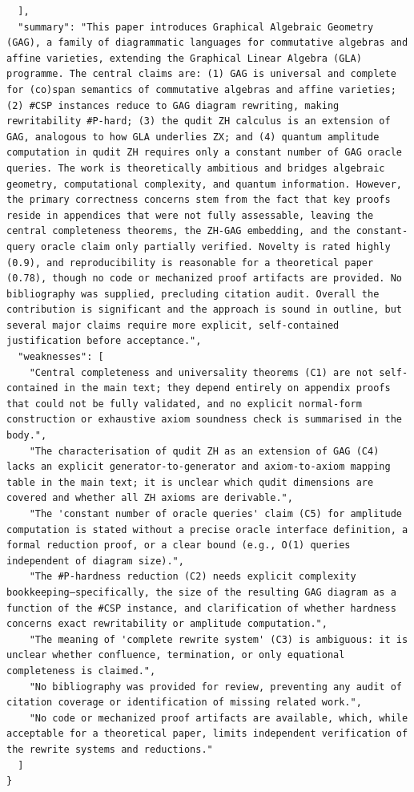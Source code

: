\documentclass[11pt]{article}
\begin{document}
\begin{verbatim}
  ],
  "summary": "This paper introduces Graphical Algebraic Geometry (GAG), a family of diagrammatic languages for commutative algebras and affine varieties, extending the Graphical Linear Algebra (GLA) programme. The central claims are: (1) GAG is universal and complete for (co)span semantics of commutative algebras and affine varieties; (2) #CSP instances reduce to GAG diagram rewriting, making rewritability #P-hard; (3) the qudit ZH calculus is an extension of GAG, analogous to how GLA underlies ZX; and (4) quantum amplitude computation in qudit ZH requires only a constant number of GAG oracle queries. The work is theoretically ambitious and bridges algebraic geometry, computational complexity, and quantum information. However, the primary correctness concerns stem from the fact that key proofs reside in appendices that were not fully assessable, leaving the central completeness theorems, the ZH-GAG embedding, and the constant-query oracle claim only partially verified. Novelty is rated highly (0.9), and reproducibility is reasonable for a theoretical paper (0.78), though no code or mechanized proof artifacts are provided. No bibliography was supplied, precluding citation audit. Overall the contribution is significant and the approach is sound in outline, but several major claims require more explicit, self-contained justification before acceptance.",
  "weaknesses": [
    "Central completeness and universality theorems (C1) are not self-contained in the main text; they depend entirely on appendix proofs that could not be fully validated, and no explicit normal-form construction or exhaustive axiom soundness check is summarised in the body.",
    "The characterisation of qudit ZH as an extension of GAG (C4) lacks an explicit generator-to-generator and axiom-to-axiom mapping table in the main text; it is unclear which qudit dimensions are covered and whether all ZH axioms are derivable.",
    "The 'constant number of oracle queries' claim (C5) for amplitude computation is stated without a precise oracle interface definition, a formal reduction proof, or a clear bound (e.g., O(1) queries independent of diagram size).",
    "The #P-hardness reduction (C2) needs explicit complexity bookkeeping—specifically, the size of the resulting GAG diagram as a function of the #CSP instance, and clarification of whether hardness concerns exact rewritability or amplitude computation.",
    "The meaning of 'complete rewrite system' (C3) is ambiguous: it is unclear whether confluence, termination, or only equational completeness is claimed.",
    "No bibliography was provided for review, preventing any audit of citation coverage or identification of missing related work.",
    "No code or mechanized proof artifacts are available, which, while acceptable for a theoretical paper, limits independent verification of the rewrite systems and reductions."
  ]
}
\end{verbatim}
\end{document}
